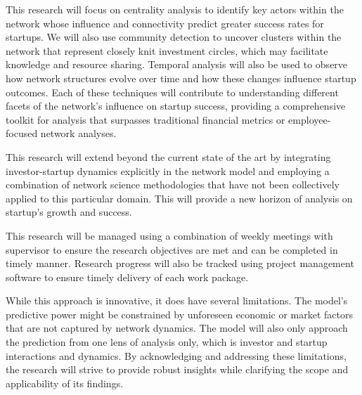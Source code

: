 \documentclass[a4paper,11pt]{article}
\begin{document}
This research will focus on centrality analysis to identify key actors within the network whose influence and connectivity predict greater success rates for startups. We will also use community detection to uncover clusters within the network that represent closely knit investment circles, which may facilitate knowledge and resource sharing. Temporal analysis will also be used to observe how network structures evolve over time and how these changes influence startup outcomes. Each of these techniques will contribute to understanding different facets of the network's influence on startup success, providing a comprehensive toolkit for analysis that surpasses traditional financial metrics or employee-focused network analyses.

This research will extend beyond the current state of the art by integrating investor-startup dynamics explicitly in the network model and employing a combination of network science methodologies that have not been collectively applied to this particular domain. This will provide a new horizon of analysis on startup's growth and success.

This research will be managed using a combination of weekly meetings with supervisor to ensure the research objectives are met and can be completed in timely manner. Research progress will also be tracked using project management software to ensure timely delivery of each work package.

While this approach is innovative, it does have several limitations.
The model’s predictive power might be constrained by unforeseen economic or market factors that are not captured by network dynamics. The model will also only approach the prediction from one lens of analysis only, which is investor and startup interactions and dynamics. By acknowledging and addressing these limitations, the research will strive to provide robust insights while clarifying the scope and applicability of its findings.
\end{document}
